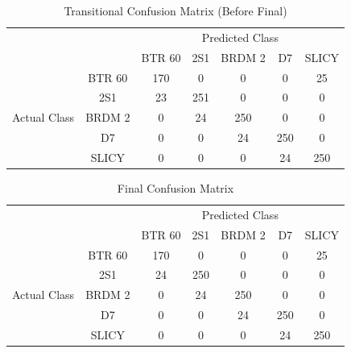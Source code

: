 \begin{table}
	\centering
	\begin{tabular}{|*{7}{c|}}
		
		\cline{3-7}
		\multicolumn{2}{c|}{}         & \multicolumn{5}{|c|}{Predicted Class} 			\\ \cline{3-7}
		\multicolumn{2}{c|}{}                  & BTR 60 & 2S1 & BRDM 2 & D7 & SLICY \\ \hline
		\multirow{5}{*}{\begin{turn}{90}Actual Class\end{turn}}
		& BTR 60 & 170    & 0   & 0      & 0  & 25	\\ \cline{2-7}
		& 2S1    & 23     & 251 & 0      & 0  & 0 	\\ \cline{2-7}
		& BRDM 2 & 0      & 24  & 250    & 0  & 0 	\\ \cline{2-7}
		& D7     & 0      & 0   & 24     & 250& 0 	\\ \cline{2-7}
		& SLICY  & 0      & 0   & 0      & 24 & 250 \\
		\hline
	\end{tabular}
	\label{tab:confusion_mid}
	\caption{Transitional Confusion Matrix (Before Final)}
	\centering
\end{table}

\begin{table}
	\centering
	\begin{tabular}{|*{7}{c|}}
		
		\cline{3-7}
		\multicolumn{2}{c|}{}         & \multicolumn{5}{|c|}{Predicted Class} 			\\ \cline{3-7}
		\multicolumn{2}{c|}{}                  & BTR 60 & 2S1 & BRDM 2 & D7 & SLICY \\ \hline
		\multirow{5}{*}{\begin{turn}{90}Actual Class\end{turn}}
		& BTR 60 & 170    & 0   & 0      & 0  & 25	\\ \cline{2-7}
		& 2S1    & 24     & 250 & 0      & 0  & 0 	\\ \cline{2-7}
		& BRDM 2 & 0      & 24  & 250    & 0  & 0 	\\ \cline{2-7}
		& D7     & 0      & 0   & 24     & 250& 0 	\\ \cline{2-7}
		& SLICY  & 0      & 0   & 0      & 24 & 250 \\
		\hline
	\end{tabular}
	\label{tab:confusion_fin}
	\caption{Final Confusion Matrix}
	\centering
\end{table}

